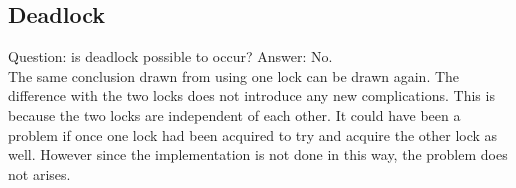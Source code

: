 \documentclass[a4paper,11pt,twoside,fleqn]{article}
\begin{document}
\subsection{Deadlock}

Question: is deadlock possible to occur? Answer: No.
\\
The same conclusion drawn from using one lock can be drawn again. The difference with the two locks does not introduce any new complications. This is because the two locks are independent of each other. It could have been a problem if once one lock had been acquired to try and acquire the other lock as well. However since the implementation is not done in this way, the problem does not arises.

\end{document}
